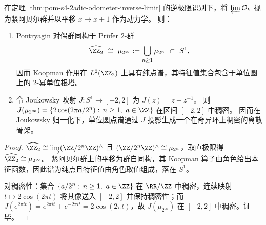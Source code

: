 \begin{corollary}\label{cor:pom-s4-odometer-pontryagin-joukowsky}
在定理 \ref{thm:pom-s4-2adic-odometer-inverse-limit} 的逆极限识别下，将 \(\varprojlim \mathcal O_k\) 视为紧阿贝尔群并以平移 \(x\mapsto x+1\) 作为动力学。
则：
\begin{enumerate}
  \item Pontryagin 对偶群同构于 Prüfer \(2\)-群
  \[
  \widehat{\ZZ_2}\ \cong\ \mu_{2^\infty}:=\bigcup_{n\ge 1}\mu_{2^n}\ \subset\ S^1,
  \]
  因而 Koopman 作用在 \(L^2(\ZZ_2)\) 上具有纯点谱，其特征值集合包含于单位圆上的 \(2\)-幂单位根塔。
  \item 令 Joukowsky 映射 \(J:S^1\to[-2,2]\) 为 \(J(z)=z+z^{-1}\)。
  则 \(J(\mu_{2^\infty})=\{2\cos(2\pi a/2^n):\,n\ge 1,\ a\in\ZZ\}\) 在区间 \([-2,2]\) 中稠密。
  因而在 Joukowsky 归一化下，单位圆点谱通过 \(J\) 投影生成一个在奇异环上稠密的离散骨架。
\end{enumerate}
\end{corollary}
\begin{proof}
\(\widehat{\ZZ_2}\cong \varinjlim (\ZZ/2^n\ZZ)^\wedge\) 且 \((\ZZ/2^n\ZZ)^\wedge\cong \mu_{2^n}\)，取直极限得 \(\widehat{\ZZ_2}\cong \mu_{2^\infty}\)。
紧阿贝尔群上的平移为群自同构，其 Koopman 算子由角色给出本征函数，因此谱为纯点且特征值由角色取值组成，落在 \(S^1\)。
\par
对稠密性：集合 \(\{a/2^n:\,n\ge 1,\ a\in\ZZ\}\) 在 \(\RR/\ZZ\) 中稠密，连续映射 \(t\mapsto 2\cos(2\pi t)\) 将其像送入 \([-2,2]\) 并保持稠密性；而
\(
J(e^{2\pi i t})=e^{2\pi i t}+e^{-2\pi i t}=2\cos(2\pi t)
\)，故 \(J(\mu_{2^\infty})\) 在 \([-2,2]\) 中稠密。证毕。
\end{proof}

